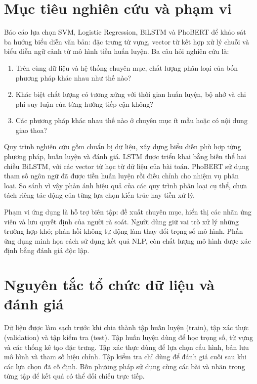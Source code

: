 \FloatBarrier
\section{Mục tiêu nghiên cứu và phạm vi}
Báo cáo lựa chọn SVM, Logistic Regression, BiLSTM và PhoBERT để khảo sát ba hướng biểu diễn văn bản: đặc trưng từ vựng, vector từ kết hợp xử lý chuỗi và biểu diễn ngữ cảnh từ mô hình tiền huấn luyện. Ba câu hỏi nghiên cứu là:
\begin{enumerate}[label=\textbf{RQ\arabic*:},leftmargin=17mm]
\item Trên cùng dữ liệu và hệ thống chuyên mục, chất lượng phân loại của bốn phương pháp khác nhau như thế nào?
\item Khác biệt chất lượng có tương xứng với thời gian huấn luyện, bộ nhớ và chi phí suy luận của từng hướng tiếp cận không?
\item Các phương pháp khác nhau thế nào ở chuyên mục ít mẫu hoặc có nội dung giao thoa?
\end{enumerate}

Quy trình nghiên cứu gồm chuẩn bị dữ liệu, xây dựng biểu diễn phù hợp từng phương pháp, huấn luyện và đánh giá. LSTM được triển khai bằng biến thể hai chiều BiLSTM, với các vector từ học từ dữ liệu của bài toán. PhoBERT sử dụng tham số ngôn ngữ đã được tiền huấn luyện rồi điều chỉnh cho nhiệm vụ phân loại. So sánh vì vậy phản ánh hiệu quả của các quy trình phân loại cụ thể, chưa tách riêng tác động của từng lựa chọn kiến trúc hay tiền xử lý.

Phạm vi ứng dụng là hỗ trợ biên tập: đề xuất chuyên mục, hiển thị các nhãn ứng viên và lưu quyết định của người rà soát. Người dùng giữ vai trò xử lý những trường hợp khó; phản hồi không tự động làm thay đổi trọng số mô hình. Phần ứng dụng minh họa cách sử dụng kết quả NLP, còn chất lượng mô hình được xác định bằng đánh giá độc lập.

\FloatBarrier
\section{Nguyên tắc tổ chức dữ liệu và đánh giá}
Dữ liệu được làm sạch trước khi chia thành tập huấn luyện (train), tập xác thực (validation) và tập kiểm tra (test). Tập huấn luyện dùng để học trọng số, từ vựng và các thống kê tạo đặc trưng. Tập xác thực dùng để lựa chọn cấu hình, bản lưu mô hình và tham số hiệu chỉnh. Tập kiểm tra chỉ dùng để đánh giá cuối sau khi các lựa chọn đã cố định. Bốn phương pháp sử dụng cùng các bài và nhãn trong từng tập để kết quả có thể đối chiếu trực tiếp.

